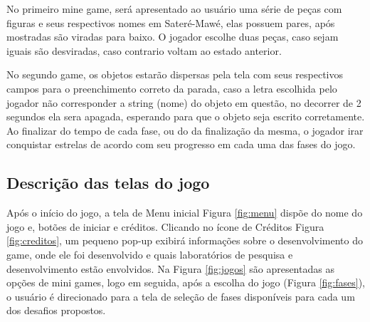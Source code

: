 \documentclass[12pt]{article}
\begin{document}
		No primeiro mine game, será apresentado ao usuário uma série de peças com figuras e seus respectivos nomes em Sateré-Mawé, elas possuem pares, após mostradas são viradas para baixo. O jogador escolhe duas peças, caso sejam iguais são desviradas, caso contrario voltam ao estado anterior.
		
		No segundo game, os objetos estarão dispersas pela tela com seus respectivos campos para o preenchimento correto da parada, caso a letra escolhida pelo jogador não corresponder a string (nome) do objeto em questão, no decorrer de 2 segundos ela sera apagada, esperando para que o objeto seja escrito corretamente. Ao finalizar do tempo de cada fase, ou do da finalização da mesma, o jogador irar conquistar estrelas de acordo com seu progresso em cada uma das fases do jogo.   
		
		
	\subsection{Descrição das telas do jogo}
		Após o início do jogo, a tela de Menu inicial Figura \ref{fig:menu} dispõe do nome do jogo e, botões de iniciar e créditos. Clicando no ícone de Créditos Figura \ref{fig:creditos}, um pequeno pop-up exibirá informações sobre o desenvolvimento do game, onde ele foi desenvolvido e quais laboratórios de pesquisa e desenvolvimento estão envolvidos. Na Figura \ref{fig:jogos} são apresentadas as opções de mini games, logo em seguida, após a escolha do jogo (Figura \ref{fig:fases}), o usuário é direcionado para a tela de seleção de fases disponíveis para cada um dos desafios propostos.
	
\end{document}
